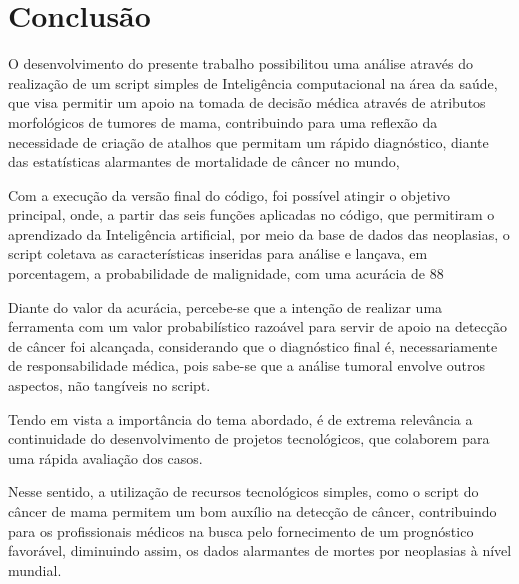\chapter{Conclusão}
\label{chapter:conclusao}

O desenvolvimento do presente trabalho possibilitou uma análise através do realização de um script simples de Inteligência computacional na área da saúde, que visa permitir um apoio na tomada de decisão médica através de atributos morfológicos de tumores de mama, contribuindo para uma reflexão da necessidade de criação de atalhos que permitam um rápido diagnóstico, diante das estatísticas alarmantes de mortalidade de câncer no mundo, 

Com a execução da versão final do código, foi possível atingir o objetivo principal, onde, a partir das seis funções aplicadas no código, que permitiram o aprendizado da Inteligência artificial, por meio da base de dados das neoplasias, o script coletava as características inseridas para análise e lançava, em porcentagem, a probabilidade de malignidade, com uma acurácia de 88%

Diante do valor da acurácia, percebe-se que a intenção de realizar uma ferramenta com um valor probabilístico razoável para servir de apoio na detecção de câncer foi alcançada, considerando que o diagnóstico final é, necessariamente de responsabilidade médica, pois sabe-se que a análise tumoral envolve outros aspectos, não tangíveis no script.

Tendo em vista a importância do tema abordado, é de extrema relevância a continuidade do desenvolvimento de projetos tecnológicos, que colaborem para uma rápida avaliação dos casos.

Nesse sentido, a utilização de recursos tecnológicos simples, como o script do câncer de mama permitem um bom auxílio na detecção de câncer, contribuindo para os profissionais médicos na busca pelo fornecimento de um prognóstico favorável, diminuindo assim, os dados alarmantes de mortes por neoplasias à nível mundial.

